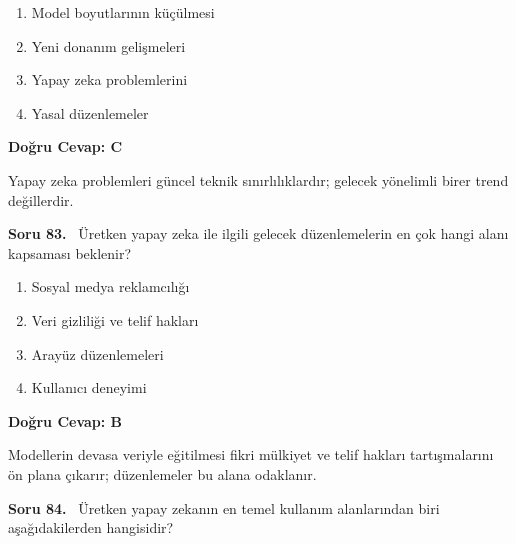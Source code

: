 \documentclass[11pt,a4paper,openany]{book}
\begin{document}
\begin{enumerate}[label=\Alph*), leftmargin=25pt, topsep=4pt, itemsep=2pt]
        \item Model boyutlarının küçülmesi
        \item Yeni donanım gelişmeleri
        \item Yapay zeka problemlerini
        \item Yasal düzenlemeler
\end{enumerate}

\vspace{4pt}
\begin{tcolorbox}[title=Cevap ve Açıklama, colback=gray!3!white, colframe=primarycolor!90!black, arc=2mm, fonttitle=\bfseries\sffamily, top=6pt, bottom=6pt]
    \textbf{Doğru Cevap: C}
    
    \vspace{2pt}
    Yapay zeka problemleri güncel teknik sınırlılıklardır; gelecek yönelimli birer trend değillerdir.
\end{tcolorbox}
\vspace{10pt}
\needspace{5cm}
\vspace{8pt}
\noindent\textbf{\large\sffamily Soru 83.} \ Üretken yapay zeka ile ilgili gelecek düzenlemelerin en çok hangi alanı kapsaması beklenir?

\begin{enumerate}[label=\Alph*), leftmargin=25pt, topsep=4pt, itemsep=2pt]
        \item Sosyal medya reklamcılığı
        \item Veri gizliliği ve telif hakları
        \item Arayüz düzenlemeleri
        \item Kullanıcı deneyimi
\end{enumerate}

\vspace{4pt}
\begin{tcolorbox}[title=Cevap ve Açıklama, colback=gray!3!white, colframe=primarycolor!90!black, arc=2mm, fonttitle=\bfseries\sffamily, top=6pt, bottom=6pt]
    \textbf{Doğru Cevap: B}
    
    \vspace{2pt}
    Modellerin devasa veriyle eğitilmesi fikri mülkiyet ve telif hakları tartışmalarını ön plana çıkarır; düzenlemeler bu alana odaklanır.
\end{tcolorbox}
\vspace{10pt}
\needspace{5cm}
\vspace{8pt}
\noindent\textbf{\large\sffamily Soru 84.} \ Üretken yapay zekanın en temel kullanım alanlarından biri aşağıdakilerden hangisidir?
\end{document}
